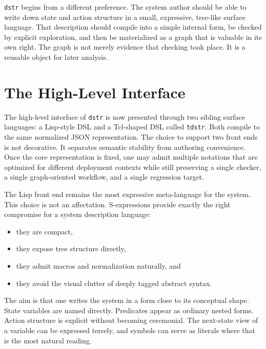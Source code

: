 \documentclass[11pt]{article}
\begin{document}
\texttt{dstr} begins from a different preference. The system author should be
able to write down state and action structure in a small, expressive, tree-like
surface language. That description should compile into a simple internal form,
be checked by explicit exploration, and then be materialized as a graph that is
valuable in its own right. The graph is not merely evidence that checking took
place. It is a reusable object for later analysis.

\section{The High-Level Interface}

The high-level interface of \texttt{dstr} is now presented through two sibling
surface languages: a Lisp-style DSL and a Tcl-shaped DSL called
\texttt{tdstr}. Both compile to the same normalized JSON representation. The
choice to support two front ends is not decorative. It separates semantic
stability from authoring convenience. Once the core representation is fixed,
one may admit multiple notations that are optimized for different deployment
contexts while still preserving a single checker, a single graph-oriented
workflow, and a single regression target.

The Lisp front end remains the most expressive meta-language for the system.
This choice is not an affectation. S-expressions provide exactly the right
compromise for a system description language:

\begin{itemize}[leftmargin=*]
\item they are compact,
\item they expose tree structure directly,
\item they admit macros and normalization naturally, and
\item they avoid the visual clutter of deeply tagged abstract syntax.
\end{itemize}

The aim is that one writes the system in a form close to its conceptual shape.
State variables are named directly. Predicates appear as ordinary nested forms.
Action structure is explicit without becoming ceremonial. The next-state view of
a variable can be expressed tersely, and symbols can serve as literals where
that is the most natural reading.
\end{document}
